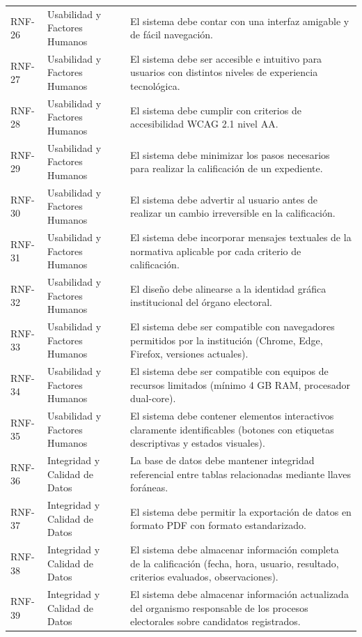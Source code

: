 \documentclass[12pt,a4paper,oneside]{book}
\begin{document}
\begin{longtable}{@{}>{\centering\arraybackslash}p{2cm}
                    >{\centering\arraybackslash}p{3cm}
                    >{\raggedright\arraybackslash}p{10cm}@{}}
\midrule
RNF-26 & Usabilidad y Factores Humanos & El sistema debe contar con una interfaz amigable y de fácil navegación. \\
RNF-27 & Usabilidad y Factores Humanos & El sistema debe ser accesible e intuitivo para usuarios con distintos niveles de experiencia tecnológica. \\
RNF-28 & Usabilidad y Factores Humanos & El sistema debe cumplir con criterios de accesibilidad WCAG 2.1 nivel AA. \\
RNF-29 & Usabilidad y Factores Humanos & El sistema debe minimizar los pasos necesarios para realizar la calificación de un expediente. \\
RNF-30 & Usabilidad y Factores Humanos & El sistema debe advertir al usuario antes de realizar un cambio irreversible en la calificación. \\
RNF-31 & Usabilidad y Factores Humanos & El sistema debe incorporar mensajes textuales de la normativa aplicable por cada criterio de calificación. \\
RNF-32 & Usabilidad y Factores Humanos & El diseño debe alinearse a la identidad gráfica institucional del órgano electoral. \\
RNF-33 & Usabilidad y Factores Humanos & El sistema debe ser compatible con navegadores permitidos por la institución (Chrome, Edge, Firefox, versiones actuales). \\
RNF-34 & Usabilidad y Factores Humanos & El sistema debe ser compatible con equipos de recursos limitados (mínimo 4 GB RAM, procesador dual-core). \\
RNF-35 & Usabilidad y Factores Humanos & El sistema debe contener elementos interactivos claramente identificables (botones con etiquetas descriptivas y estados visuales). \\
\midrule
RNF-36 & Integridad y Calidad de Datos & La base de datos debe mantener integridad referencial entre tablas relacionadas mediante llaves foráneas. \\
RNF-37 & Integridad y Calidad de Datos & El sistema debe permitir la exportación de datos en formato PDF con formato estandarizado. \\
RNF-38 & Integridad y Calidad de Datos & El sistema debe almacenar información completa de la calificación (fecha, hora, usuario, resultado, criterios evaluados, observaciones). \\
RNF-39 & Integridad y Calidad de Datos & El sistema debe almacenar información actualizada del organismo responsable de los procesos electorales sobre candidatos registrados. \\

\end{longtable}
\end{document}
